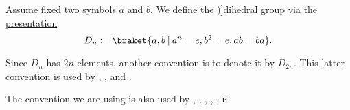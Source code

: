 \begin{definition}\label{def:dihedral_group}
  Assume fixed two \hyperref[def:formal_language/symbol]{symbols} \( a \) and \( b \). We define the \term[ru=группа диедра (\cite[161]{Винберг2014КурсАлгебры})]{dihedral group} via the \hyperref[def:group_presentation]{presentation}
  \begin{equation}\label{eq:def:dihedral_group}
    D_n \coloneqq \braket{ a, b \given a^n = e, b^2 = e, ab = ba }.
  \end{equation}
\end{definition}
\begin{comments}
  \item Since \( D_n \) has \( 2n \) elements, another convention is to denote it by \( D_{2n} \). This latter convention is used by
  ,
  ,
   and
  .

  The convention we are using is also used by
  ,
  ,
  ,
  ,
  ,
   и
\end{comments}
